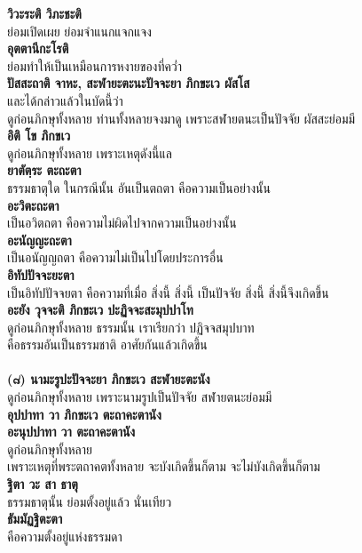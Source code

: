 \documentclass[12pt]{article}
\begin{document}
\textbf{วิวะระติ วิภะชะติ}\\
\indent ย่อมเปิดเผย ย่อมจำแนกแจกแจง\\
\textbf{อุตตานีกะโรติ}\\
\indent ย่อมทำให้เป็นเหมือนการหงายของที่คว่ำ\\
\textbf{ปัสสะถาติ จาหะ, สะฬายะตะนะปัจจะยา ภิกขะเว ผัสโส}\\
\indent และได้กล่าวแล้วในบัดนี้ว่า \\
\indent ดูก่อนภิกษุทั้งหลาย ท่านทั้งหลายจงมาดู เพราะสฬายตนะเป็นปัจจัย ผัสสะย่อมมี\\
\textbf{อิติ โข ภิกขเว}\\
\indent ดูก่อนภิกษุทั้งหลาย เพราะเหตุดังนี้แล\\
\textbf{ยาตัตฺระ ตะถะตา}\\
\indent ธรรมธาตุใด ในกรณีนั้น อันเป็นตถตา คือความเป็นอย่างนั้น\\
\textbf{อะวิตะถะตา}\\
\indent เป็นอวิตถตา คือความไม่ผิดไปจากความเป็นอย่างนั้น\\
\textbf{อะนัญญะถะตา}\\
\indent เป็นอนัญญถตา คือความไม่เป็นไปโดยประการอื่น\\
\textbf{อิทัปปัจจะยะตา}\\
\indent เป็นอิทัปปัจจยตา คือความที่เมื่อ สิ่งนี้ สิ่งนี้ เป็นปัจจัย สิ่งนี้ สิ่งนี้จึงเกิดขึ้น\\
\textbf{อะยัง วุจจะติ ภิกขะเว ปะฏิจจะสะมุปปาโท}\\
\indent ดูก่อนภิกษุทั้งหลาย ธรรมนั้น เราเรียกว่า ปฏิจจสมุปบาท \\
\indent คือธรรมอันเป็นธรรมชาติ อาศัยกันแล้วเกิดขึ้น\\
\\
\textbf{(๘) นามะรูปะปัจจะยา ภิกขะเว สะฬายะตะนัง}\\
\indent ดูก่อนภิกษุทั้งหลาย เพราะนามรูปเป็นปัจจัย สฬายตนะย่อมมี\\
\textbf{อุปปาทา วา ภิกขะเว ตะถาคะตานัง\\
อะนุปปาทา วา ตะถาคะตานัง}\\
\indent ดูก่อนภิกษุทั้งหลาย\\
\indent เพราะเหตุที่พระตถาคตทั้งหลาย จะบังเกิดขึ้นก็ตาม จะไม่บังเกิดขึ้นก็ตาม\\
\textbf{ฐิตา วะ สา ธาตุ}\\
\indent ธรรมธาตุนั้น ย่อมตั้งอยู่แล้ว นั่นเทียว\\
\textbf{ธัมมัฏฐิตะตา}\\
\indent คือความตั้งอยู่แห่งธรรมดา\\
\end{document}
